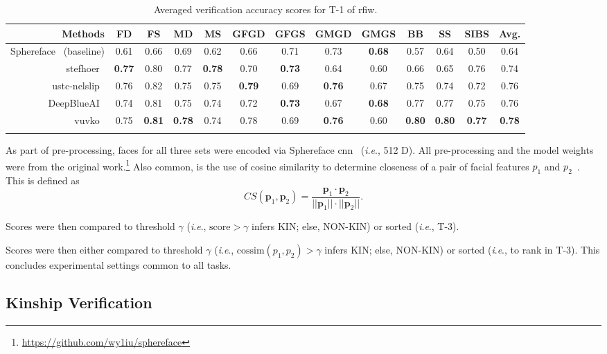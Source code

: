 \documentclass[letterpaper, 10 pt, conference]{ieeeconf}
\newcommand{\ie}{\textit{i}.\textit{e}., }
\begin{document}
\begin{table}[t]
\scriptsize
\centering
\caption {Averaged verification accuracy scores for T-1 of \ac{rfiw}.}
\label{tab:benchmark:track1}
\begin{tabular}{r|cccc|cccc|ccc|c}
  Methods & FD & FS & MD & MS & GFGD & GFGS & GMGD & GMGS & BB & SS & SIBS & Avg. \\
  \midrule
  Sphereface~\cite{Liu_2017_CVPR} (baseline) & 0.61 & 0.66 & 0.69 & 0.62 & 0.66 &0.71& 0.73 & \textbf{0.68} & 0.57 & 0.64 & 0.50 & 0.64\\
    stefhoer~\cite{id2} & \textbf{0.77} & 0.80 & 0.77 & \textbf{0.78} & 0.70 & \textbf{0.73} & 0.64 & 0.60 & 0.66 & 0.65 & 0.76 & 0.74\\
     ustc-nelslip~\cite{id6} & 0.76 & 0.82 & 0.75 & 0.75 & \textbf{0.79} & 0.69 & \textbf{0.76} & 0.67 & 0.75 & 0.74 & 0.72 & 0.76\\
     DeepBlueAI~\cite{id3} & 0.74 & 0.81 & 0.75 & 0.74 & 0.72 & \textbf{0.73} & 0.67 & \textbf{0.68} & 0.77 & 0.77 & 0.75 & 0.76\\
  vuvko~\cite{id4}& 0.75 & \textbf{0.81} & \textbf{0.78} & 0.74 & 0.78 & 0.69 & \textbf{0.76} & 0.60 & \textbf{0.80} & \textbf{0.80} & \textbf{0.77} & \textbf{0.78}\\\vspace{-5mm}
\end{tabular}
\end{table}


As part of pre-processing, faces for all three sets were encoded via Sphereface \ac{cnn}~\cite{Liu_2017_CVPR}  (\ie 512 D). All pre-processing and the model weights were from the original work.\footnote{\href{https://github.com/wy1iu/sphereface}{https://github.com/wy1iu/sphereface}} Also common, is the use of cosine similarity to determine closeness of a pair of facial features $p_1$ and $p_2$~\cite{nguyen2010cosine}. This is defined as
$$
CS(\pmb p_1, \pmb p_2) = \frac {\pmb p_1 \cdot \pmb p_2}{||\pmb p_1|| \cdot ||\pmb p_2||}.
$$ 


Scores were then compared to threshold $\gamma$ (\ie $\text{score} > \gamma$ infers KIN; else, NON-KIN) or sorted (\ie T-3).


Scores were then either compared to threshold $\gamma$ (\ie $\text{cossim}(p_1, p_2) > \gamma$ infers KIN; else, NON-KIN) or sorted (\ie to rank in T-3). This concludes experimental settings common to all tasks.



\subsection{Kinship Verification}\label{sec:kinver}
\end{document}
